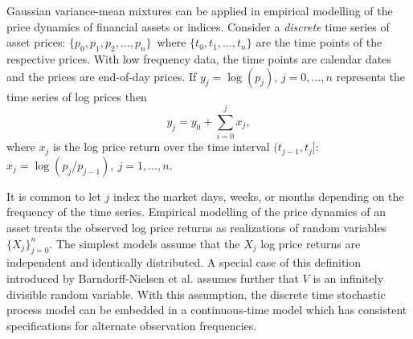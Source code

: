 \documentclass{article}
\begin{document}
Gaussian variance-mean mixtures can be applied in empirical modelling of the price dynamics of financial assets or indices. Consider a \textit{discrete} time series of asset prices:
$\{p_0, p_1, p_2, \dots, p_n\} \,$
where $ \{t_0, t_1, \dots, t_n \}$ are the time points of the respective prices. With low frequency data, the time points are calendar dates and the prices are end-of-day prices.  If $y_j = \log(p_j)$, $j=0, \dots, n$ represents the time series of  log prices then 
$$ y_j = y_0 + \sum_{i=0}^j x_j,$$ 
where $x_j$ is the log price return
over the time interval $(t_{j-1}, t_j]$: $x_j = \log(p_j/p_{j-1}), \ j=1, \dots, n.$

It is common to let $j$ index the market days, weeks, or months depending on the frequency of the time series. Empirical modelling of the price dynamics of an asset treats the observed log price returns as realizations of random variables
$\{X_j\}_{j=0}^n.$ The simplest models assume that the $X_j$ log price returns are independent and identically distributed. A special case of this definition  introduced by Barndorff-Nielsen et al. \cite{Variancemeanmixtures} assumes further that $V$ is an infinitely divisible random variable. With this assumption, the discrete time stochastic process model can be embedded in a continuous-time model which has consistent specifications for alternate observation frequencies.
\end{document}
